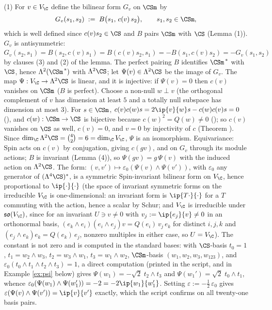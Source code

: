 (1) For $v \in V_\C$ define the bilinear form $G_v$ on $\CSm$ by
\[
G_v(s_1, s_2) \;:=\; B\bigl(s_1,\, c(v)\,s_2\bigr), \qquad s_1, s_2 \in \CSm,
\]
which is well defined since $c(v)s_2 \in \CS$ and $B$ pairs $\CSm$ with $\CS$ (Lemma (1)). $G_v$ is antisymmetric: $G_v(s_2, s_1) = B(s_2, c(v)s_1) = B(c(v)s_2, s_1) = -B(s_1, c(v)s_2) = -G_v(s_1,s_2)$ by clauses (3) and (2) of the lemma. The perfect pairing $B$ identifies $\CSm^{\,*}$ with $\CS$, hence $\Lambda^2(\CSm^{\,*})$ with $\Lambda^2\CS$; let $\Psi(v) \in \Lambda^2\CS$ be the image of $G_v$. The map $\Psi: V_\C \to \Lambda^2\CS$ is linear, and it is injective: if $\Psi(v) = 0$ then $c(v)$ vanishes on $\CSm$ ($B$ is perfect). Choose a non-null $w \perp v$ (the orthogonal complement of $v$ has dimension at least $5$ and a totally null subspace has dimension at most $3$). For $s \in \CSm$, $c(v)c(w)s = 2\ip{v}{w}s - c(w)c(v)s = 0$ (), and $c(w): \CSm \to \CS$ is bijective because $c(w)^2 = Q(w) \neq 0$ (); so $c(v)$ vanishes on $\CS$ as well, $c(v) = 0$, and $v = 0$ by injectivity of $c$ (Theorem ). Since $\dim_\C \Lambda^2\CS = \binom42 = 6 = \dim_\C V_\C$, $\Psi$ is an isomorphism. Equivariance: $\mathrm{Spin}$ acts on $c(v)$ by conjugation, giving $c(gv)$, and on $G_v$ through its module actions; $B$ is invariant (Lemma (4)), so $\Psi(gv) = g\,\Psi(v)$ with the induced action on $\Lambda^2\CS$. The form: $(v, v') \mapsto \varepsilon_0(\Psi(v)\wedge\Psi(v'))$, with $\varepsilon_0$ any generator of $(\Lambda^4\CS)^*$, is a symmetric $\mathrm{Spin}$-invariant bilinear form on $V_\C$, hence proportional to $\ip{\cdot}{\cdot}$ (the space of invariant symmetric forms on the irreducible $V_\C$ is one-dimensional: an invariant form is $\ip{T\cdot}{\cdot}$ for a $T$ commuting with the action, hence a scalar by Schur; and $V_\C$ is irreducible under $\mathfrak{so}(V_\C)$, since for an invariant $U \ni v \neq 0$ with $v_j := \ip{e_j}{v} \neq 0$ in an orthonormal basis, $(e_k\wedge e_i)(e_i\wedge e_j)v = Q(e_i)\,v_j\,e_k$ for distinct $i, j, k$ and $(e_j\wedge e_k)e_k = Q(e_k)\,e_j$, nonzero multiples in either case, so $U = V_\C$). The constant is not zero and is computed in the standard bases: with $\CS$-basis $t_0 = 1$, $t_1 = w_2\wedge w_3$, $t_2 = w_3 \wedge w_1$, $t_3 = w_1\wedge w_2$, $\CSm$-basis $(w_1, w_2, w_3, w_{123})$, and $\varepsilon_0(t_0\wedge t_1\wedge t_2\wedge t_3) = 1$, a direct computation (printed in the script, and in Example \ref{ex:psi} below) gives $\Psi(w_1) = -\sqrt2\; t_2\wedge t_3$ and $\Psi(w_1') = \sqrt2\; t_0 \wedge t_1$, whence $\varepsilon_0(\Psi(w_1)\wedge\Psi(w_1')) = -2 = -2\ip{w_1}{w_1'}$. Setting $\varepsilon := -\tfrac12\,\varepsilon_0$ gives $\varepsilon(\Psi(v)\wedge\Psi(v')) = \ip{v}{v'}$ exactly, which the script confirms on all twenty-one basis pairs.
